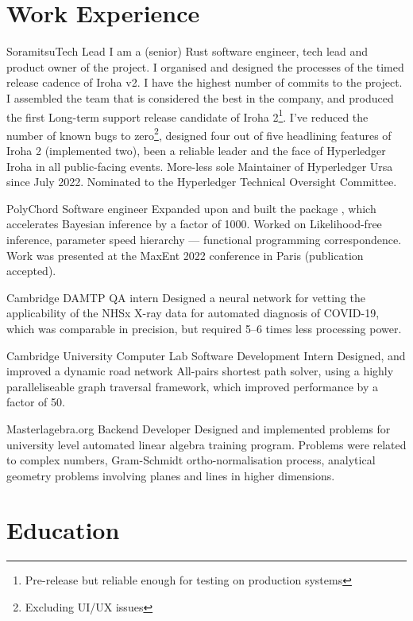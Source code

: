 \documentclass{CurriculumVitae}[10pt, draft, condensed]
\begin{document}
\section*{Work Experience} {%
  \setlength{\parindent}{0in}%

   {Soramitsu}{Tech Lead} {I am a (senior) Rust
    software engineer, tech lead and product owner of the project.  I
    organised and designed the processes of the timed release cadence
    of Iroha v2. I have the highest number of commits to the project.
    I assembled the team that is considered the best in the company,
    and produced the first Long-term support release candidate of
    Iroha 2\footnote{Pre-release but reliable enough for testing on
      production systems}. I've reduced the number of known bugs to
    zero\footnote{Excluding UI/UX issues}, designed four out of five
    headlining features of Iroha 2 (implemented two), been a reliable
    leader and the face of Hyperledger Iroha in all public-facing
    events. More-less sole Maintainer of Hyperledger Ursa since July
    2022. Nominated to the Hyperledger Technical Oversight
    Committee. }

   {PolyChord} {Software
    engineer} { Expanded upon and built the package ,
    which accelerates Bayesian inference by a factor of 1000. Worked
    on Likelihood-free inference, parameter speed hierarchy ---
    functional programming correspondence. Work was presented at the
    MaxEnt 2022 conference in Paris (publication accepted).  }

   {Cambridge DAMTP} {QA intern} {Designed a
    neural network for vetting the applicability of the NHSx X-ray
    data for automated diagnosis of COVID-19, which was comparable in
    precision, but required 5--6 times less processing power.  }

   {Cambridge University Computer Lab}
  {Software Development Intern} {Designed, and improved a dynamic road
    network All-pairs shortest path solver, using a highly
    paralleliseable graph traversal framework, which improved
    performance by a factor of 50.  }

  {Masterlagebra.org} {Backend Developer} {Designed and implemented
    problems for university level automated linear algebra training
    program. Problems were related to complex numbers, Gram-Schmidt
    ortho-normalisation process, analytical geometry problems
    involving planes and lines in higher dimensions.  }
  \pagebreak{} \section*{Education}%

}
\end{document}
